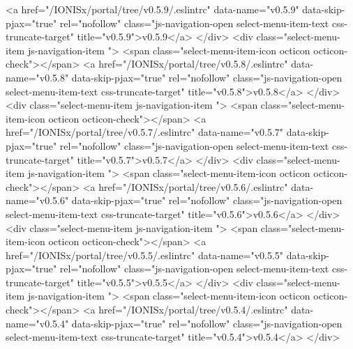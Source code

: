               <a href="/IONISx/portal/tree/v0.5.9/.eslintrc"
                 data-name="v0.5.9"
                 data-skip-pjax="true"
                 rel="nofollow"
                 class="js-navigation-open select-menu-item-text css-truncate-target"
                 title="v0.5.9">v0.5.9</a>
            </div>
            <div class="select-menu-item js-navigation-item ">
              <span class="select-menu-item-icon octicon octicon-check"></span>
              <a href="/IONISx/portal/tree/v0.5.8/.eslintrc"
                 data-name="v0.5.8"
                 data-skip-pjax="true"
                 rel="nofollow"
                 class="js-navigation-open select-menu-item-text css-truncate-target"
                 title="v0.5.8">v0.5.8</a>
            </div>
            <div class="select-menu-item js-navigation-item ">
              <span class="select-menu-item-icon octicon octicon-check"></span>
              <a href="/IONISx/portal/tree/v0.5.7/.eslintrc"
                 data-name="v0.5.7"
                 data-skip-pjax="true"
                 rel="nofollow"
                 class="js-navigation-open select-menu-item-text css-truncate-target"
                 title="v0.5.7">v0.5.7</a>
            </div>
            <div class="select-menu-item js-navigation-item ">
              <span class="select-menu-item-icon octicon octicon-check"></span>
              <a href="/IONISx/portal/tree/v0.5.6/.eslintrc"
                 data-name="v0.5.6"
                 data-skip-pjax="true"
                 rel="nofollow"
                 class="js-navigation-open select-menu-item-text css-truncate-target"
                 title="v0.5.6">v0.5.6</a>
            </div>
            <div class="select-menu-item js-navigation-item ">
              <span class="select-menu-item-icon octicon octicon-check"></span>
              <a href="/IONISx/portal/tree/v0.5.5/.eslintrc"
                 data-name="v0.5.5"
                 data-skip-pjax="true"
                 rel="nofollow"
                 class="js-navigation-open select-menu-item-text css-truncate-target"
                 title="v0.5.5">v0.5.5</a>
            </div>
            <div class="select-menu-item js-navigation-item ">
              <span class="select-menu-item-icon octicon octicon-check"></span>
              <a href="/IONISx/portal/tree/v0.5.4/.eslintrc"
                 data-name="v0.5.4"
                 data-skip-pjax="true"
                 rel="nofollow"
                 class="js-navigation-open select-menu-item-text css-truncate-target"
                 title="v0.5.4">v0.5.4</a>
            </div>
